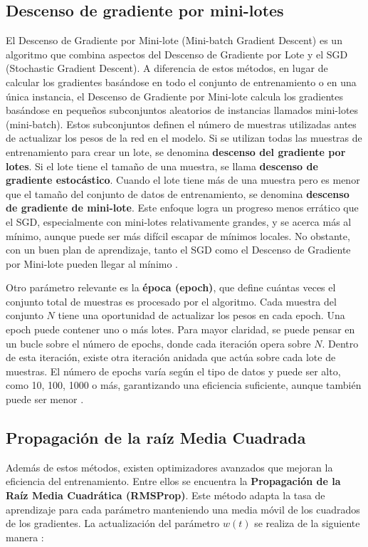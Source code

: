 \subsection{Descenso de gradiente por mini-lotes}


El Descenso de Gradiente por Mini-lote (Mini-batch Gradient Descent) es un algoritmo que combina aspectos del Descenso de Gradiente por Lote y el SGD (Stochastic Gradient Descent). A diferencia de estos métodos, en lugar de calcular los gradientes basándose en todo el conjunto de entrenamiento o en una única instancia, el Descenso de Gradiente por Mini-lote calcula los gradientes basándose en pequeños subconjuntos aleatorios de instancias llamados mini-lotes (mini-batch). Estos subconjuntos definen el número de muestras utilizadas antes de actualizar los pesos de la red en el modelo. Si se utilizan todas las muestras de entrenamiento para crear un lote, se denomina \textbf{descenso del gradiente por lotes}. Si el lote tiene el tamaño de una muestra, se llama \textbf{descenso de gradiente estocástico}. Cuando el lote tiene más de una muestra pero es menor que el tamaño del conjunto de datos de entrenamiento, se denomina \textbf{descenso de gradiente de mini-lote}. Este enfoque logra un progreso menos errático que el SGD, especialmente con mini-lotes relativamente grandes, y se acerca más al mínimo, aunque puede ser más difícil escapar de mínimos locales. No obstante, con un buen plan de aprendizaje, tanto el SGD como el Descenso de Gradiente por Mini-lote pueden llegar al mínimo \citep{geron2022hands}.

Otro parámetro relevante es la \textbf{época (epoch)}, que define cuántas veces el conjunto total de muestras es procesado por el algoritmo. Cada muestra del conjunto \(N\) tiene una oportunidad de actualizar los pesos en cada epoch. Una epoch puede contener uno o más lotes. Para mayor claridad, se puede pensar en un bucle sobre el número de epochs, donde cada iteración opera sobre \(N\). Dentro de esta iteración, existe otra iteración anidada que actúa sobre cada lote de muestras. El número de epochs varía según el tipo de datos y puede ser alto, como 10, 100, 1000 o más, garantizando una eficiencia suficiente, aunque también puede ser menor \citep{pajares2021aprendizaje}.


\subsection{Propagación de la raíz Media Cuadrada}

Además de estos métodos, existen optimizadores avanzados que mejoran la eficiencia del entrenamiento. Entre ellos se encuentra la \textbf{Propagación de la Raíz Media Cuadrática (RMSProp)}. Este método adapta la tasa de aprendizaje para cada parámetro manteniendo una media móvil de los cuadrados de los gradientes. La actualización del parámetro \(w(t)\) se realiza de la siguiente manera \citep{pajares2021aprendizaje}:

